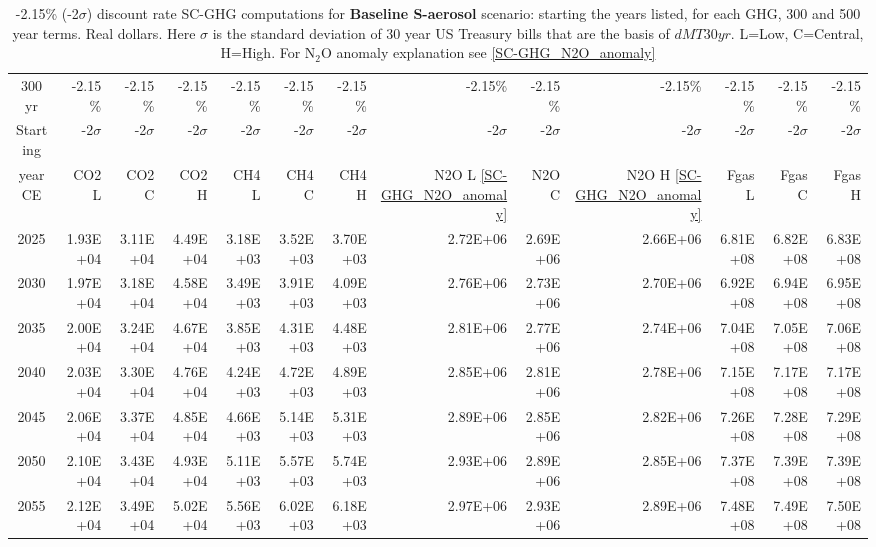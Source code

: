 \documentclass{article}
\begin{document}
\begin{table}
     \caption{-2.15\% (-2$\sigma$) discount rate   SC-GHG computations for \textbf{Baseline S-aerosol} scenario: starting the years listed, for each GHG, 300 and 500 year terms. Real dollars. Here $\sigma$ is the standard deviation of 30 year US Treasury bills that are the basis of $dMT30yr$. L=Low, C=Central, H=High. For N$_2$O anomaly explanation see \ref{SC-GHG_N2O_anomaly}} 
\label{PVs_300_yearSCC_BH2.15}
\small
\begin{tabular}{crrr|rrr|rrr|rrr}
300 yr   & -2.15\%    & -2.15\%    & -2.15\%    & -2.15\%    & -2.15\%    & -2.15\%    & -2.15\%    & -2.15\%    & -2.15\%    & -2.15\%    & -2.15\%    & -2.15\%    \\
Starting & -2$\sigma$ & -2$\sigma$ & -2$\sigma$ & -2$\sigma$ & -2$\sigma$ & -2$\sigma$ & -2$\sigma$ & -2$\sigma$ & -2$\sigma$ & -2$\sigma$ & -2$\sigma$ & -2$\sigma$ \\
year CE  & CO2 L      & CO2 C      & CO2 H      & CH4 L      & CH4 C      & CH4 H      & N2O L \ref{SC-GHG_N2O_anomaly}     & N2O C      & N2O H \ref{SC-GHG_N2O_anomaly}      & Fgas L     & Fgas C     & Fgas H     \\
2025     & 1.93E+04   & 3.11E+04   & 4.49E+04   & 3.18E+03   & 3.52E+03   & 3.70E+03   & 2.72E+06   & 2.69E+06   & 2.66E+06   & 6.81E+08   & 6.82E+08   & 6.83E+08   \\
2030     & 1.97E+04   & 3.18E+04   & 4.58E+04   & 3.49E+03   & 3.91E+03   & 4.09E+03   & 2.76E+06   & 2.73E+06   & 2.70E+06   & 6.92E+08   & 6.94E+08   & 6.95E+08   \\
2035     & 2.00E+04   & 3.24E+04   & 4.67E+04   & 3.85E+03   & 4.31E+03   & 4.48E+03   & 2.81E+06   & 2.77E+06   & 2.74E+06   & 7.04E+08   & 7.05E+08   & 7.06E+08   \\
2040     & 2.03E+04   & 3.30E+04   & 4.76E+04   & 4.24E+03   & 4.72E+03   & 4.89E+03   & 2.85E+06   & 2.81E+06   & 2.78E+06   & 7.15E+08   & 7.17E+08   & 7.17E+08   \\
2045     & 2.06E+04   & 3.37E+04   & 4.85E+04   & 4.66E+03   & 5.14E+03   & 5.31E+03   & 2.89E+06   & 2.85E+06   & 2.82E+06   & 7.26E+08   & 7.28E+08   & 7.29E+08   \\
2050     & 2.10E+04   & 3.43E+04   & 4.93E+04   & 5.11E+03   & 5.57E+03   & 5.74E+03   & 2.93E+06   & 2.89E+06   & 2.85E+06   & 7.37E+08   & 7.39E+08   & 7.39E+08   \\
2055     & 2.12E+04   & 3.49E+04   & 5.02E+04   & 5.56E+03   & 6.02E+03   & 6.18E+03   & 2.97E+06   & 2.93E+06   & 2.89E+06   & 7.48E+08   & 7.49E+08   & 7.50E+08   \\

\end{tabular}
\end{table}
\end{document}
